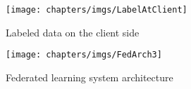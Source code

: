 \begin{figure}[h]
	\vspace{6pt} %
	\centering
	\texttt{[image: chapters/imgs/LabelAtClient]}
	
	\begingroup
	\setlength{\baselineskip}{20pt} %
	
	\vspace{6pt}
	{\rmfamily\wuhao Labeled data on the client side} %
	
	\vspace{0pt}
	\endgroup
	
	\label{LabelAtClient}
\end{figure}
\vspace{-0.35cm}



\begin{figure}[h]
	\vspace{6pt} %
	\centering
	\texttt{[image: chapters/imgs/FedArch3]} %
	
	\begingroup
	\setlength{\baselineskip}{20pt} %
	
	\vspace{6pt}
	{\wuhao Federated learning system architecture} %
	
	\vspace{0pt}
	\endgroup
	
	\label{FedArch} %
\end{figure}
\vspace{-0.35cm}




